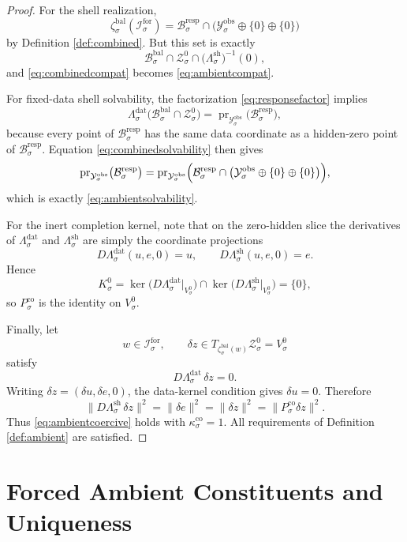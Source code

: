 \documentclass[11pt]{article}
\newcommand{\ForSpace}[1]{\mathcal I_{#1}^{\mathrm{for}}}
\newcommand{\DataSpace}[1]{\mathcal Y_{#1}^{\mathrm{obs}}}
\newcommand{\BalBody}[1]{\mathcal B_{#1}^{\mathrm{bal}}}
\newcommand{\BalData}[1]{\Lambda_{#1}^{\mathrm{dat}}}
\newcommand{\BalShell}[1]{\Lambda_{#1}^{\mathrm{sh}}}
\newcommand{\ZeroHiddenSlice}[1]{\mathcal Z_{#1}^{0}}
\newcommand{\ZeroHiddenVec}[1]{V_{#1}^{0}}
\newcommand{\Kernel}[1]{K_{#1}^{0}}
\newcommand{\BalEmbed}[1]{\zeta_{#1}^{\mathrm{bal}}}
\newcommand{\StateComp}[1]{P_{#1}^{\mathrm{co}}}
\newcommand{\ResponseImage}[1]{\mathcal B_{#1}^{\mathrm{resp}}}
\begin{document}
\begin{proof}
For the shell realization,
\[
\BalEmbed{\sigma}(\ForSpace{\sigma})
=
\ResponseImage{\sigma}\cap
\bigl(
\DataSpace{\sigma}\oplus\{0\}\oplus\{0\}
\bigr)
\]
by Definition \ref{def:combined}. But this set is exactly
\[
\BalBody{\sigma}\cap
\ZeroHiddenSlice{\sigma}\cap
\bigl(\BalShell{\sigma}\bigr)^{-1}(0),
\]
and \eqref{eq:combinedcompat} becomes \eqref{eq:ambientcompat}.

For fixed-data shell solvability, the factorization \eqref{eq:responsefactor} implies
\[
\BalData{\sigma}\bigl(\BalBody{\sigma}\cap\ZeroHiddenSlice{\sigma}\bigr)
=
\operatorname{pr}_{\DataSpace{\sigma}}\bigl(\ResponseImage{\sigma}\bigr),
\]
because every point of \(\ResponseImage{\sigma}\) has the same data coordinate as a hidden-zero point of \(\ResponseImage{\sigma}\). Equation \eqref{eq:combinedsolvability} then gives
\[
\operatorname{pr}_{\DataSpace{\sigma}}\bigl(\ResponseImage{\sigma}\bigr)
=
\operatorname{pr}_{\DataSpace{\sigma}}
\Bigl(
\ResponseImage{\sigma}\cap
\bigl(
\DataSpace{\sigma}\oplus\{0\}\oplus\{0\}
\bigr)
\Bigr),
\]
which is exactly \eqref{eq:ambientsolvability}.

For the inert completion kernel, note that on the zero-hidden slice the derivatives of \(\BalData{\sigma}\) and \(\BalShell{\sigma}\) are simply the coordinate projections
\[
D\BalData{\sigma}(u,e,0)=u,
\qquad
D\BalShell{\sigma}(u,e,0)=e.
\]
Hence
\[
\Kernel{\sigma}
=
\ker\bigl(D\BalData{\sigma}\big|_{\ZeroHiddenVec{\sigma}}\bigr)
\cap
\ker\bigl(D\BalShell{\sigma}\big|_{\ZeroHiddenVec{\sigma}}\bigr)
=
\{0\},
\]
so \(\StateComp{\sigma}\) is the identity on \(\ZeroHiddenVec{\sigma}\).

Finally, let
\[
w\in\ForSpace{\sigma},
\qquad
\delta z\in T_{\BalEmbed{\sigma}(w)}\ZeroHiddenSlice{\sigma}=\ZeroHiddenVec{\sigma}
\]
satisfy
\[
D\BalData{\sigma}\,\delta z=0.
\]
Writing \(\delta z=(\delta u,\delta e,0)\), the data-kernel condition gives \(\delta u=0\). Therefore
\[
\|D\BalShell{\sigma}\,\delta z\|^{2}
=
\|\delta e\|^{2}
=
\|\delta z\|^{2}
=
\|\StateComp{\sigma}\delta z\|^{2}.
\]
Thus \eqref{eq:ambientcoercive} holds with \(\kappa_{\sigma}^{\mathrm{co}}=1\). All requirements of Definition \ref{def:ambient} are satisfied.
\end{proof}

\section{Forced Ambient Constituents and Uniqueness}
\end{document}

